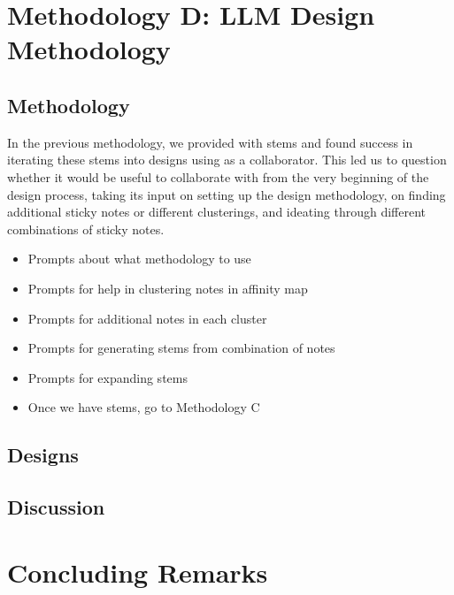 
\section{Methodology D: LLM Design Methodology}
\label{sec:meth4}

\subsection{Methodology}


In the previous methodology, we provided \gpt with stems and found success in iterating these stems into designs using \gpt as a collaborator.  This led us to question whether it would be useful to collaborate with \gpt from the very beginning of the design process, taking its input on setting up the design methodology, on finding additional sticky notes or different clusterings, and ideating through different combinations of sticky notes.

\begin{itemize}
\item Prompts about what methodology to use
\item Prompts for help in clustering notes in affinity map
\item Prompts for additional notes in each cluster
\item Prompts for generating stems from combination of notes
\item Prompts for expanding stems
\item Once we have stems, go to Methodology C
\end{itemize}

\subsection{Designs}


\subsection{Discussion}



\section{Concluding Remarks}




